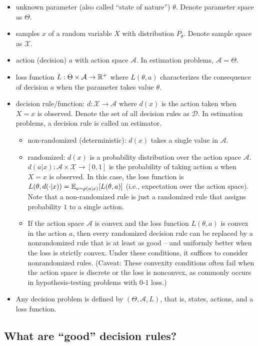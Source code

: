 \begin{itemize}
    \item unknown parameter (also called ``state of nature'') $\theta$. Denote parameter space as $\Theta$.
    \item samples $x$ of a random variable $X$ with distribution $P_\theta$. Denote sample space as $\mathcal{X}$.
    \item action (decision) $a$ with action space $\mathcal{A}$. In estimation problems, $\mathcal{A} = \Theta$.
    \item loss function $L:\Theta \times \mathcal{A} \to \mathbb{R}^+$ where $L(\theta, a)$ characterizes the consequence of decision $a$ when the parameter takes value $\theta$.
    \item decision rule/function: $d:\mathcal{X} \to \mathcal{A}$ where $d(x)$ is the action taken when $X=x$ is observed. Denote the set of all decision rules as $\mathcal{D}$. In estimation problems, a decision rule is called an estimator.
    \begin{itemize}
        \item non-randomized (deterministic): $d(x)$ takes a single value in $\mathcal{A}$.
        \item randomized: $d(x)$ is a probability distribution over the action space $\mathcal{A}$. $d(a|x): \mathcal{A} \times \mathcal{X} \to [0,1]$ is the probability of taking action $a$ when $X=x$ is observed. In this case, the loss function is $L(\theta, d(\cdot|x)) = \mathbb{E}_{a \sim p(a|x)}[L(\theta, a)]$ (i.e., expectation over the action space). Note that a non-randomized rule is just a randomized rule that assigns probability $1$ to a single action.
        \item If the action space $\mathcal{A}$ is convex and the loss function $L(\theta,a)$ is convex in the action $a$, then every randomized decision rule can be replaced by a nonrandomized rule that is at least as good -- and uniformly better when the loss is strictly convex. Under these conditions, it suffices to consider nonrandomized rules. (Caveat: These convexity conditions often fail when the action space is discrete or the loss is nonconvex, as commonly occurs in hypothesis-testing problems with $0$-$1$ loss.)
    \end{itemize}
    \item Any decision problem is defined by $(\Theta, \mathcal{A}, L)$, that is, states, actions, and a loss function.
\end{itemize}

\subsection{What are ``good'' decision rules?}
